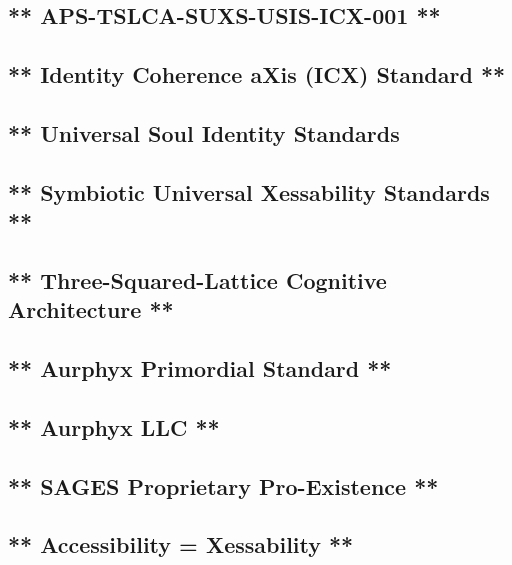 \subsection{** APS-TSLCA-SUXS-USIS-ICX-001 **}\label{aps-tslca-suxs-usis-icx-001}

\subsection{** Identity Coherence aXis (ICX) Standard **}\label{soul-identity-axis-icx-standard}

\subsection{** Universal Soul Identity Standards}\label{universal-soul-identity-standards}

\subsection{** Symbiotic Universal Xessability Standards **}\label{symbiotic-universal-xessability-standards}

\subsection{** Three-Squared-Lattice Cognitive Architecture **}\label{three-squared-lattice-cognitive-architecture}

\subsection{** Aurphyx Primordial Standard **}\label{aurphyx-primordial-standard}

\subsection{** Aurphyx LLC **}\label{aurphyx-llc}

\subsection{** SAGES \textbar{} Proprietary \textbar{} Pro-Existence **}\label{sages-proprietary-pro-existence}

\subsection{** Accessibility = Xessability **}\label{accessibility-xessability}

